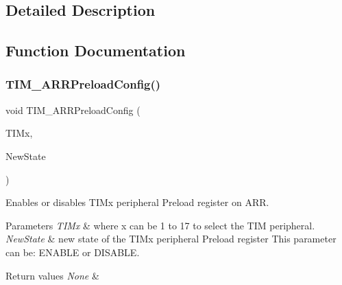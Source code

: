 \subsection{Detailed Description}


\subsection{Function Documentation}
\mbox{\label{group___t_i_m___private___functions_ga42b44b9fc2b0798d733720dd6bac1ac0}} 
\subsubsection{\texorpdfstring{TIM\_ARRPreloadConfig()}{TIM\_ARRPreloadConfig()}}
{\footnotesize\ttfamily void T\+I\+M\+\_\+\+A\+R\+R\+Preload\+Config (\begin{DoxyParamCaption}\item[{\mbox{\hyperlink{struct_t_i_m___type_def}{T\+I\+M\+\_\+\+Type\+Def}} $\ast$}]{T\+I\+Mx,  }\item[{\mbox{\hyperlink{group___exported__types_gac9a7e9a35d2513ec15c3b537aaa4fba1}{Functional\+State}}}]{New\+State }\end{DoxyParamCaption})}



Enables or disables T\+I\+Mx peripheral Preload register on A\+RR. 


\begin{DoxyParams}{Parameters}
{\em T\+I\+Mx} & where x can be 1 to 17 to select the T\+IM peripheral. \\
\hline
{\em New\+State} & new state of the T\+I\+Mx peripheral Preload register This parameter can be\+: E\+N\+A\+B\+LE or D\+I\+S\+A\+B\+LE. \\
\hline
\end{DoxyParams}

\begin{DoxyRetVals}{Return values}
{\em None} & \\
\hline
\end{DoxyRetVals}
\mbox{\label{group___t_i_m___private___functions_ga3df4ba3f0727f63ce621e2b2e6035d4f}} 
